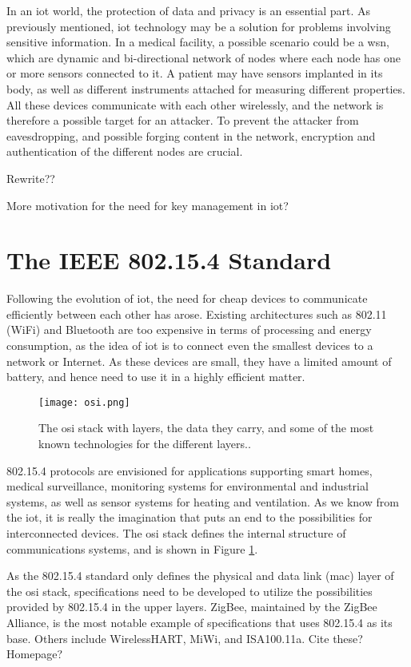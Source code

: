 In an \gls{iot} world, the protection of data and privacy is an essential part. As previously mentioned, \gls{iot} technology may be a solution for problems involving sensitive information. In a medical facility, a possible scenario could be a \gls{wsn}, which are dynamic and bi-directional network of nodes where each node has one or more sensors connected to it. A patient may have sensors implanted in its body, as well as different instruments attached for measuring different properties. All these devices communicate with each other wirelessly, and the network is therefore a possible target for an attacker. To prevent the attacker from eavesdropping, and possible forging content in the network, encryption and authentication of the different nodes are crucial.


Rewrite??

More motivation for the need for key management in \gls{iot}?



\section{The IEEE 802.15.4 Standard}

Following the evolution of \gls{iot}, the need for cheap devices to communicate efficiently between each other has arose. Existing architectures such as 802.11 (WiFi) and Bluetooth are too expensive in terms of processing and energy consumption, as the idea of \gls{iot} is to connect even the smallest devices to a network or Internet. As these devices are small, they have a limited amount of battery, and hence need to use it in a highly efficient matter.

\begin{figure}
	\centering
	\texttt{[image: osi.png]}
	\caption{The \gls{osi} stack with layers, the data they carry, and some of the most known technologies for the different layers..}
	\label{fig:osi}
\end{figure}

802.15.4 protocols are envisioned for applications supporting smart homes, medical surveillance, monitoring systems for environmental and industrial systems, as well as sensor systems for heating and ventilation. As we know from the \gls{iot}, it is really the imagination that puts an end to the possibilities for interconnected devices. The \gls{osi} stack defines the internal structure of communications systems, and is shown in Figure \ref{fig:osi}.

As the 802.15.4 standard only defines the physical and data link (\gls{mac}) layer of the \gls{osi} stack, specifications need to be developed to utilize the possibilities provided by 802.15.4 in the upper layers. ZigBee, maintained by the ZigBee Alliance, is the most notable example of specifications that uses 802.15.4 as its base. Others include WirelessHART, MiWi, and ISA100.11a. Cite these? Homepage?

